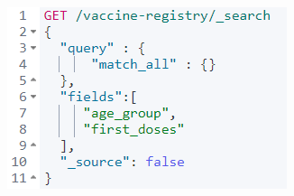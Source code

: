\documentclass{article}[IEEEtran]
\begin{document}
\begin{figure}[H]
\begin{center}
\begin{minipage}[b]{0.4\textwidth}
    \includegraphics[width=\textwidth, frame]{Query_3.PNG}
    \subcaption{}
  \end{minipage}
  \hfill
  \begin{minipage}[b]{0.4\textwidth}

\end{minipage}
\end{center}
\end{figure}
\end{document}
